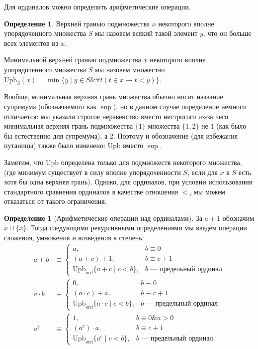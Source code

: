 \documentclass[a4paper,11pt]{article}
\theoremstyle{definition}
\newtheorem{dfn}[thm]{Определение}
\newcommand{\amp}{\mathbin{\&}}
\begin{document}
Для ординалов можно определить арифметические операции.

\begin{dfn}
Верхней гранью подмножества $x$ некоторого вполне упорядоченного множества $S$
мы назовем всякий такой элемент $y$, что он больше всех элементов из $x$.

Минимальной верхней гранью подмножества $x$ некоторого вполне упорядоченного
множества $S$ мы назовем множество $\mathrm{Upb}_S(x) = \min\{y \mid y \in S
\amp \forall t(t \in x \to t < y)\}$.
\end{dfn}

Вообще, минимальная верхняя грань множества обычно носит название супремума
(обозначаемого как $\sup$), но в данном случае определение немного отличается:
мы указали строгое неравенство вместо нестрогого из-за чего минимальная верхняя
грань подмножества $\{1\}$ множества $\{1, 2\}$ не $1$ (как было бы естественно
для супремума), а $2$. Поэтому и обозначение (для избежания путаницы) также было
изменено: $\mathrm{Upb}$ вместо $\sup$.

Заметим, что $\mathrm{Upb}$ определена только для подмножеств некоторого
множества, (где минимум существует в силу вполне упорядоченности $S$, если для
$x$ в $S$ есть хотя бы одна верхняя грань). Однако, для ординалов, при условии
использования стандартного сравнения ординалов в качестве отношения $<$, мы
можем отказаться от такого ограничения.

\begin{dfn}[Арифметические операции над ординалами]
За $a + 1$ обозначим $x \cup \{x\}$. Тогда следующими рекурсивными определениями
мы введем операции сложения, умножения и возведения в степень:
\begin{align*}
a + b &\equiv
\begin{cases}
a, & b \equiv 0\\
(a + c) + 1, & b \equiv c + 1\\
\mathrm{Upb}_{\mathrm{ord}}\{a + c \mid c < b\}, & b \text{ --- предельный ординал}
\end{cases}\\
a \cdot b &\equiv
\begin{cases}
0, & b \equiv 0\\
(a \cdot c) + a, & b \equiv c + 1\\
\mathrm{Upb}_{\mathrm{ord}}\{a \cdot c \mid c < b\}, & b \text{ --- предельный ординал}
\end{cases}\\
a^b &\equiv
\begin{cases}
1, & b \equiv 0 \amp a > 0\\
(a^c) \cdot a, & b \equiv c + 1\\
\mathrm{Upb}_{\mathrm{ord}}\{a^c \mid c < b\}, & b \text{ --- предельный ординал}
\end{cases}
\end{align*}
\end{dfn}
\end{document}
